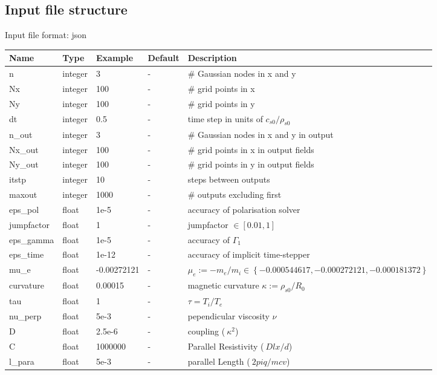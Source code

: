 \documentclass{hitec} %
\begin{document}
\subsection{Input file structure}
Input file format: json

\begin{longtable}{llll>{\RaggedRight}p{7cm}}
\toprule
\rowcolor{gray!50}\textbf{Name} &  \textbf{Type} & \textbf{Example} & \textbf{Default} & \textbf{Description}  \\ \midrule
n      & integer & 3 & - &\# Gaussian nodes in x and y \\
Nx     & integer &100& - &\# grid points in x \\
Ny     & integer &100& - &\# grid points in y \\
dt     & integer &0.5& - &time step in units of $c_{s0}/\rho_{s0}$ \\
n\_out  & integer &3  & - &\# Gaussian nodes in x and y in output \\
Nx\_out & integer &100& - &\# grid points in x in output fields \\
Ny\_out & integer &100& - &\# grid points in y in output fields \\
itstp  & integer &10  & - &   steps between outputs \\
maxout & integer &1000& - &      \# outputs excluding first \\
eps\_pol   & float &1e-5    & - &  accuracy of polarisation solver \\
jumpfactor & float &1& - &     jumpfactor $\in \left[0.01,1\right]$\\
eps\_gamma & float &1e-5    & - & accuracy of $\Gamma_1$ \\
eps\_time  & float &1e-12   & - & accuracy of implicit time-stepper \\
mu\_e       & float & -0.00272121& - & $\mu_e :=-m_e/m_i \in \left\{ -0.000544617, -0.000272121, -0.000181372 \right\}$\\
curvature  & float &0.00015& - & magnetic curvature $\kappa:=\rho_{s0}/R_0$ \\
tau        & float &1      & - & $\tau = T_i/T_e$  \\
nu\_perp   & float &5e-3   & - & pependicular viscosity $\nu$ \\
D          & float &2.5e-6    & - & coupling ($ ~ \kappa^2$)\\
C          & float & 1000000  & - & Parallel Resistivity ($~D lx/d$)     \\
l\_para    & float &5e-3   & - & parallel Length ($~ 2 pi q / mcv$) \\

\end{longtable}
\end{document}
